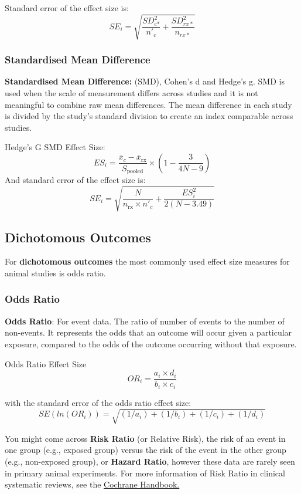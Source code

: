 \documentclass[
]{book}
\begin{document}
Standard error of the effect size is:
\[SE_i = \sqrt{ \frac{SD_\text{c*}^2}{n'_c} + \frac {SD_{rx*}^2}{n_{rx*}} }\]

\hypertarget{standardised-mean-difference}{%
\subsubsection{Standardised Mean Difference}\label{standardised-mean-difference}}

\textbf{Standardised Mean Difference:} (SMD), Cohen's d and Hedge's g. SMD is used when the scale of measurement differs across studies and it is not meaningful to combine raw mean differences. The mean difference in each study is divided by the study's standard division to create an index comparable across studies.

Hedge's G SMD Effect Size:
\[ES_i = \frac {\bar{x}_c - \bar{x}_\text{rx}}{S_{\text{pooled}}} \times (1 - \frac{3}{4N - 9})  \]
And standard error of the effect size is:
\[ SE_i = \sqrt{ \frac{N}{n_{\text{rx}} \times n'_c} + \frac{ES_i^2}{2(N - 3.49)} }\]

\hypertarget{dichotomous-outcomes}{%
\subsection{Dichotomous Outcomes}\label{dichotomous-outcomes}}

For \textbf{dichotomous outcomes} the most commonly used effect size measures for animal studies is odds ratio.

\hypertarget{odds-ratio}{%
\subsubsection{Odds Ratio}\label{odds-ratio}}

\textbf{Odds Ratio}: For event data. The ratio of number of events to the number of non-events. It represents the odds that an outcome will occur given a particular exposure, compared to the odds of the outcome occurring without that exposure.

Odds Ratio Effect Size
\[ OR_i = \frac {a_i \times d_i}{b_i \times c_i}  \]

with the standard error of the odds ratio effect size:
\[ SE(ln(OR_i)) = \sqrt{ (1/a_i)+(1/b_i)+(1/c_i)+(1/d_i) }   \]

You might come across \textbf{Risk Ratio} (or Relative Risk), the risk of an event in one group (e.g., exposed group) versus the risk of the event in the other group (e.g., non-exposed group), or \textbf{Hazard Ratio}, however these data are rarely seen in primary animal experiments. For more information of Risk Ratio in clinical systematic reviews, see the \href{https://handbook-5-1.cochrane.org/chapter_9/box_9_2_a_calculation_of_risk_ratio_rr_odds_ratio_or_and.htm}{Cochrane Handbook.}
\end{document}

